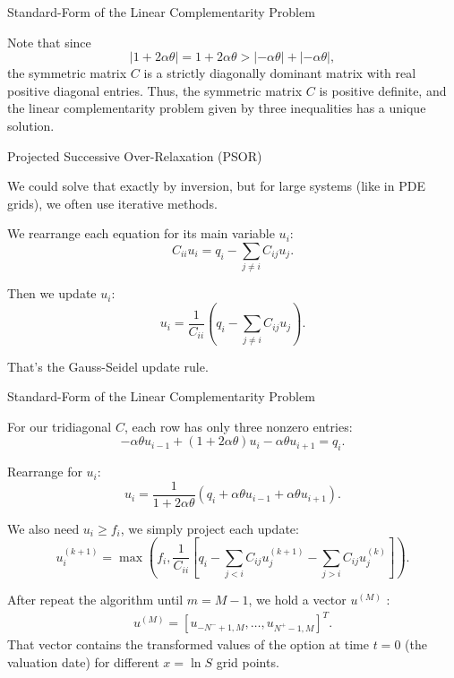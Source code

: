\documentclass{beamer}
\begin{document}
\begin{frame}{Standard-Form of the Linear Complementarity Problem}

    {\footnotesize \footnotesize
    Note that since
    \[
    |1 + 2\alpha\theta| = 1 + 2\alpha\theta > |-\alpha\theta| + |-\alpha\theta|,
    \]
    the symmetric matrix $C$ is a strictly diagonally dominant matrix with real positive diagonal entries. 
    Thus, the symmetric matrix $C$ is positive definite, and the linear complementarity problem 
    given by three inequalities has a unique solution.
    \vspace{1em}
    \par Projected Successive Over-Relaxation (PSOR)
    \par We could solve that exactly by inversion, but for 
    large systems (like in PDE grids), we often use iterative methods.
    \par We rearrange each equation for its main variable $u_i$:
\[
C_{ii}u_i = q_i - \sum_{j\neq i} C_{ij}u_j.
\]

Then we update $u_i$:
\[
u_i = \frac{1}{C_{ii}} \left( q_i - \sum_{j\neq i} C_{ij}u_j \right).
\]

That's the Gauss-Seidel update rule.

    }
    
    
\end{frame}
 


\begin{frame}{Standard-Form of the Linear Complementarity Problem}

    {\footnotesize \footnotesize
     For our tridiagonal $C$, each row has only three nonzero entries:
    \[
    -\alpha \theta u_{i-1} + (1 + 2\alpha \theta)u_i - \alpha \theta u_{i+1} = q_i.
    \]

    Rearrange for $u_i$:
    \[
    u_i = \frac{1}{1 + 2\alpha \theta} \left( q_i + \alpha \theta u_{i-1} + \alpha \theta u_{i+1} \right).
    \]
    
    We also need $u_i \geq f_i$, we simply project each update:
    \[
    u_i^{(k+1)} = \max \left( f_i, \frac{1}{C_{ii}} \left[ q_i - \sum_{j<i} C_{ij} u_j^{(k+1)} 
    - \sum_{j>i} C_{ij} u_j^{(k)} \right] \right).
    \]
    \vspace{1em}
    \par After repeat the algorithm until $m = M-1$, we hold a vector $u^{(M)}$ :
    \begin{align*}
        u^{(M)} = [u_{-N^- + 1, M}, \ldots, u_{N^+ - 1, M}]^T.
    \end{align*}
    That vector contains the transformed values of 
    the option at time $t = 0$ (the valuation date) for different $x = \ln S$ grid points.
    }
\end{frame}
\end{document}
